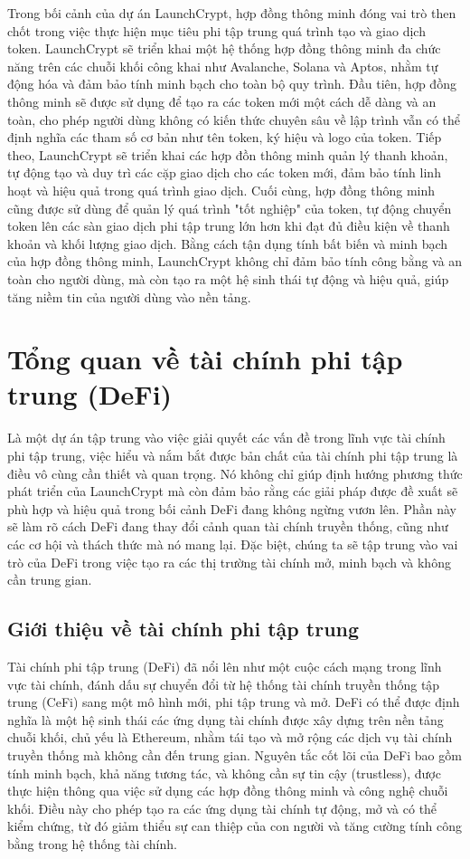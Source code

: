 Trong bối cảnh của dự án LaunchCrypt, hợp đồng thông minh đóng vai trò then
chốt
trong việc thực hiện mục tiêu phi tập trung quá trình tạo và giao dịch token.
LaunchCrypt sẽ triển khai một hệ thống hợp đồng thông minh đa chức năng trên
các
chuỗi khối công khai như Avalanche, Solana và Aptos, nhằm tự động hóa và đảm
bảo tính minh bạch cho toàn bộ quy trình. Đầu tiên, hợp đồng thông minh sẽ được
sử
dụng để tạo ra các token mới một cách dễ dàng và an toàn, cho phép người dùng
không có kiến thức chuyên sâu về lập trình vẫn có thể định nghĩa các tham số cơ
bản như tên token, ký hiệu và logo của token. Tiếp theo, LaunchCrypt sẽ triển
khai các hợp đồn thông minh quản lý thanh khoản, tự động tạo và duy trì các cặp
giao dịch cho các token mới, đảm bảo tính linh hoạt và hiệu quả trong quá trình
giao dịch. Cuối cùng, hợp đồng thông minh cũng được sử dùng để quản lý quá
trình
"tốt nghiệp" của token, tự động chuyển token lên các sàn giao dịch phi tập
trung lớn hơn khi đạt đủ điều kiện về thanh khoản và khối lượng giao dịch. Bằng
cách tận dụng tính bất biến và minh bạch của hợp đồng thông minh, LaunchCrypt
không
chỉ đảm bảo tính công bằng và an toàn cho người dùng, mà còn tạo ra một hệ sinh
thái tự động và hiệu quả, giúp tăng niềm tin của người dùng vào nền tảng.

\section{Tổng quan về tài chính phi tập trung (DeFi)}
\hspace{1cm}Là một dự án tập trung vào việc giải quyết các vấn đề trong lĩnh
vực tài chính phi tập trung, việc hiểu và nắm bắt được bản chất của tài chính
phi tập trung là điều vô cùng cần thiết và quan trọng. Nó không chỉ giúp định
hướng phương thức phát triển của LaunchCrypt mà còn đảm bảo rằng các giải pháp
được đề xuất sẽ phù hợp và hiệu quả trong bối cảnh DeFi đang không ngừng vươn
lên. Phần này sẽ làm rõ cách DeFi đang thay đổi cảnh quan tài chính truyền
thống, cũng như các cơ hội và thách thức mà nó mang lại. Đặc biệt, chúng ta sẽ
tập trung vào vai trò của DeFi trong việc tạo ra các thị trường tài chính mở,
minh bạch và không cần trung gian.

\subsection{Giới thiệu về tài chính phi tập trung}
\hspace{1cm}Tài chính phi tập trung (DeFi) đã nổi lên như một cuộc cách mạng
trong lĩnh vực tài chính, đánh dấu sự chuyển đổi từ hệ thống tài chính truyền
thống tập trung (CeFi) sang một mô hình mới, phi tập trung và mở. DeFi có thể
được định nghĩa là một hệ sinh thái các ứng dụng tài chính được xây dựng trên
nền tảng chuỗi khối, chủ yếu là Ethereum, nhằm tái tạo và mở rộng các dịch vụ
tài chính truyền thống mà không cần đến trung gian. Nguyên tắc cốt lõi của DeFi
bao gồm tính minh bạch, khả năng tương tác, và không cần sự tin cậy
(trustless), được thực hiện thông qua việc sử dụng các hợp đồng thông minh và
công
nghệ chuỗi khối. Điều này cho phép tạo ra các ứng dụng tài chính tự động, mở và
có thể kiểm chứng, từ đó giảm thiểu sự can thiệp của con người
và tăng cường tính công bằng trong hệ thống tài chính.

